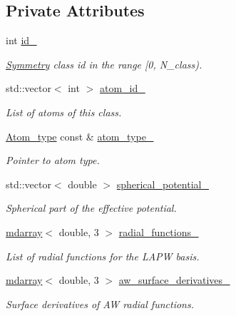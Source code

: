 \subsection*{Private Attributes}
\begin{DoxyCompactItemize}
\item 
int \hyperlink{classsirius_1_1_atom__symmetry__class_aa4c86581251ec529aed2437f1a370b30}{id\+\_\+}
\begin{DoxyCompactList}\small\item\em \hyperlink{classsirius_1_1_symmetry}{Symmetry} class id in the range \mbox{[}0, N\+\_\+class). \end{DoxyCompactList}\item 
std\+::vector$<$ int $>$ \hyperlink{classsirius_1_1_atom__symmetry__class_a1a554889233bd3be37d1ae94071e6fed}{atom\+\_\+id\+\_\+}
\begin{DoxyCompactList}\small\item\em List of atoms of this class. \end{DoxyCompactList}\item 
\hyperlink{classsirius_1_1_atom__type}{Atom\+\_\+type} const \& \hyperlink{classsirius_1_1_atom__symmetry__class_a2668fe2a989f893e02a0bc1e5424e4ea}{atom\+\_\+type\+\_\+}
\begin{DoxyCompactList}\small\item\em Pointer to atom type. \end{DoxyCompactList}\item 
std\+::vector$<$ double $>$ \hyperlink{classsirius_1_1_atom__symmetry__class_a4393b778a7ad833fc5cf834e04ce529c}{spherical\+\_\+potential\+\_\+}
\begin{DoxyCompactList}\small\item\em Spherical part of the effective potential. \end{DoxyCompactList}\item 
\hyperlink{classsddk_1_1mdarray}{mdarray}$<$ double, 3 $>$ \hyperlink{classsirius_1_1_atom__symmetry__class_a386343d0b45a21cdccecd10e71c7c3f4}{radial\+\_\+functions\+\_\+}
\begin{DoxyCompactList}\small\item\em List of radial functions for the L\+A\+P\+W basis. \end{DoxyCompactList}\item 
\hyperlink{classsddk_1_1mdarray}{mdarray}$<$ double, 3 $>$ \hyperlink{classsirius_1_1_atom__symmetry__class_a5166789d0468f3b5ef13cabe4fd81d85}{aw\+\_\+surface\+\_\+derivatives\+\_\+}
\begin{DoxyCompactList}\small\item\em Surface derivatives of A\+W radial functions. \end{DoxyCompactList}\item 

\end{DoxyCompactItemize}

